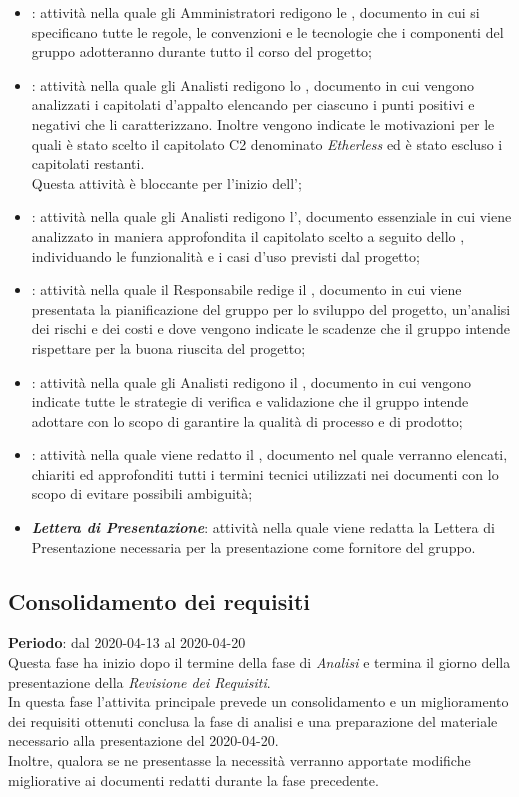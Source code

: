\begin{itemize}
	\item \textbf{\textit{\NdP{}}}: attività nella quale gli Amministratori redigono le \NdP{}, documento in cui si specificano tutte le regole, le convenzioni e le tecnologie che i componenti del gruppo adotteranno durante tutto il corso del progetto;
	\item \textbf{\textit{\SdF{}}}: attività nella quale gli Analisti redigono lo \SdF, documento in cui vengono analizzati i capitolati d'appalto elencando per ciascuno i punti positivi e negativi che li caratterizzano. Inoltre vengono indicate le motivazioni per le quali è stato scelto il capitolato C2 denominato \textit{Etherless} ed è stato escluso i capitolati restanti. \\
	Questa attività è bloccante per l'inizio dell'\AdR{};
	\item \textbf{\textit{\AdR{}}}: attività nella quale gli Analisti redigono l'\AdR, documento essenziale in cui viene analizzato in maniera approfondita il capitolato scelto a seguito dello \SdF{}, individuando le funzionalità e i casi d'uso previsti dal progetto;
	\item \textbf{\textit{\PdP{}}}: attività nella quale il Responsabile redige il \PdP, documento in cui viene presentata la pianificazione del gruppo per lo sviluppo del progetto, un'analisi dei rischi e dei costi e dove vengono indicate le scadenze che il gruppo intende rispettare per la buona riuscita del progetto;
	\item \textbf{\textit{\PdQ{}}}: attività nella quale gli Analisti redigono il \PdQ, documento in cui vengono indicate tutte le strategie di verifica e validazione che il gruppo intende adottare con lo scopo di garantire la qualità di processo e di prodotto;
	\item \textbf{\textit{\Glossario{}}}: attività nella quale viene redatto il \Glossario, documento nel quale verranno elencati, chiariti ed approfonditi tutti i termini tecnici utilizzati nei documenti con lo scopo di evitare possibili ambiguità;
	\item \textbf{\textit{Lettera di Presentazione}}: attività nella quale viene redatta la Lettera di Presentazione necessaria per la presentazione come fornitore del gruppo.
\end{itemize}

\subsection{Consolidamento dei requisiti}
\textbf{Periodo}: dal 2020-04-13 al 2020-04-20 \\
Questa fase ha inizio dopo il termine della fase di \textit{Analisi} e termina il giorno della presentazione della \textit{Revisione dei Requisiti}. \\
In questa fase l'attivita principale prevede un consolidamento e un miglioramento dei requisiti ottenuti conclusa la fase di analisi e una preparazione del materiale necessario alla presentazione del 2020-04-20. \\
Inoltre, qualora se ne presentasse la necessità verranno apportate modifiche migliorative ai documenti redatti durante la fase precedente.

